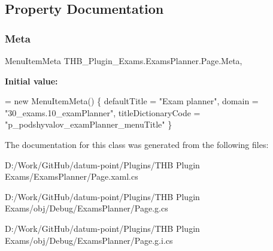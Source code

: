 \subsection{Property Documentation}
\mbox{\label{class_t_h_b___plugin___exams_1_1_exams_planner_1_1_page_a5641a870e91f0211959eba05532cbbdf}} 
\subsubsection{\texorpdfstring{Meta}{Meta}}
{\footnotesize\ttfamily Menu\+Item\+Meta T\+H\+B\+\_\+\+Plugin\+\_\+\+Exams.\+Exams\+Planner.\+Page.\+Meta\hspace{0.3cm}{\ttfamily [get]}, {\ttfamily [set]}}

{\bfseries Initial value\+:}
\begin{DoxyCode}
= \textcolor{keyword}{new} MenuItemMeta()
        \{
            defaultTitle = \textcolor{stringliteral}{"Exam planner"},
            domain = \textcolor{stringliteral}{"30\_exams.10\_examPlanner"},
            titleDictionaryCode = \textcolor{stringliteral}{"p\_podshyvalov\_examPlanner\_menuTitle"}
        \}
\end{DoxyCode}


The documentation for this class was generated from the following files\+:\begin{DoxyCompactItemize}
\item 
D\+:/\+Work/\+Git\+Hub/datum-\/point/\+Plugins/\+T\+H\+B Plugin Exams/\+Exams\+Planner/Page.\+xaml.\+cs\item 
D\+:/\+Work/\+Git\+Hub/datum-\/point/\+Plugins/\+T\+H\+B Plugin Exams/obj/\+Debug/\+Exams\+Planner/Page.\+g.\+cs\item 
D\+:/\+Work/\+Git\+Hub/datum-\/point/\+Plugins/\+T\+H\+B Plugin Exams/obj/\+Debug/\+Exams\+Planner/Page.\+g.\+i.\+cs\end{DoxyCompactItemize}
